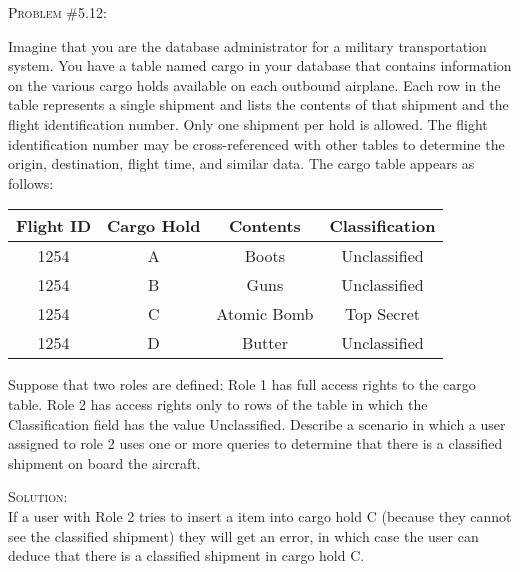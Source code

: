 \documentclass[12pt]{article}
\newenvironment{problem}[1]
{\begin{mdframed}[linewidth=0.8pt]
        \textsc{Problem #1:}

}
    {\end{mdframed}}
\newenvironment{solution}
    {\textsc{Solution:}\\}
    {\newpage}%
\begin{document}
	\begin{problem}{\#5.12}
		Imagine that you are the database administrator for a military transportation
		system. You have a table named cargo in your database that contains
		information on the various cargo holds available on each outbound airplane.
		Each row in the table represents a single shipment and lists the contents of
		that shipment and the flight identification number. Only one shipment per hold
		is allowed. The flight identification number may be cross-referenced with other
		tables to determine the origin, destination, flight time, and similar data.
		The cargo table appears as follows:
		\begin{center}
			\begin{tabular}{|c|c|c|c|}
				\hline
				\textbf{Flight ID} & \textbf{Cargo Hold} & \textbf{Contents} & \textbf{Classification}\\
				\hline
				1254 & A & Boots & Unclassified\\
				\hline
				1254 & B & Guns & Unclassified\\
				\hline
				1254 & C & Atomic  Bomb & Top Secret\\
				\hline
				1254 & D & Butter & Unclassified\\
				\hline
			\end{tabular}
		\end{center}
		Suppose that two roles are defined: Role 1 has full access rights to the cargo table.
		Role 2 has access rights only to rows of the table in which the Classification field
		has the value Unclassified. Describe a scenario in which a user assigned to role 2
		uses one or more queries to determine that there is a classified shipment on
		board the aircraft.
	\end{problem}
	\begin{solution}
		If a user with Role 2 tries to insert a item into cargo hold C (because they cannot
		see the classified shipment) they will get an error, in which case the user can deduce
		that there is a classified shipment in cargo hold C.
	\end{solution}
	
\end{document}
